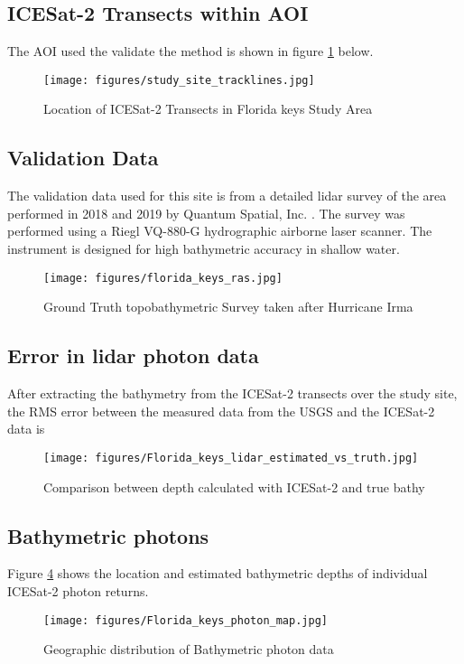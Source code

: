 \subsection{ICESat-2 Transects within AOI}
The AOI used the validate the method is shown in figure \ref{fig:keys_transects} below.
\begin{figure}[h!]
    \centering
    \texttt{[image: figures/study\_site\_tracklines.jpg]}
    \caption{Location of ICESat-2 Transects in Florida keys Study Area}
    \label{fig:keys_transects}
\end{figure}
\subsection{Validation Data}
The validation data used for this site is from a detailed lidar survey of the area performed in 2018 and 2019 by Quantum Spatial, Inc. \parencite{Keys2019Lidar}. The survey was performed using a Riegl VQ-880-G hydrographic airborne laser scanner. The instrument is designed for high bathymetric accuracy in shallow water.
\begin{figure}[h!]
    \centering
    \texttt{[image: figures/florida\_keys\_ras.jpg]}
    \caption{Ground Truth topobathymetric Survey taken after Hurricane Irma}
    \label{fig:truebathy}
\end{figure}
\subsection{Error in lidar photon data}
After extracting the bathymetry from the ICESat-2 transects over the study site, the RMS error between the measured data from the USGS and the ICESat-2 data is
\begin{figure}[htbp]
    \centering
    \texttt{[image: figures/Florida\_keys\_lidar\_estimated\_vs\_truth.jpg]}
    \caption{Comparison between depth calculated with ICESat-2 and true bathy}
    \label{fig:fl_truth_vs_measured_points}
\end{figure}
% 

% 

\subsection{Bathymetric photons}
Figure \ref{fig:bathyphotonmap} shows the location and estimated bathymetric depths of individual ICESat-2 photon returns.
\begin{figure}[h!]
    \centering
    \texttt{[image: figures/Florida\_keys\_photon\_map.jpg]}
    \caption{Geographic distribution of Bathymetric photon data}
    \label{fig:bathyphotonmap}
\end{figure}

